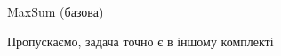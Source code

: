 ﻿\begin{problemAllDefault}{MaxSum (базова)}\label{problem:maxsum-basic}

Пропускаємо, задача точно є в іншому комплекті

\end{problemAllDefault}
